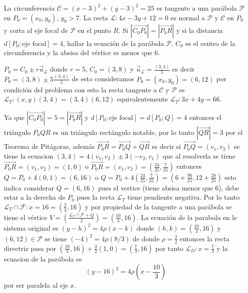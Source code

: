 \documentclass[12pt,]{report}
\theoremstyle{slplain}
\let\BeginKnitrBlock\begin \let\EndKnitrBlock\end
\begin{document}
\BeginKnitrBlock{exercise}
\protect\hypertarget{exr:unnamed-chunk-5}{}{\label{exr:unnamed-chunk-5} }La circunferencia \(\mathcal{C}=(x-3)^2+(y-3)^2=25\) es tangente a una parábola \(\mathcal{P}\) en \(P_0=(x_0,y_0)\), \(y_0>7\). La recta \(\mathcal{L}:4x-3y+12=0\) es normal a \(\mathcal{P}\) y \(\mathcal{C}\) en \(P_0\) y corta al eje focal de \(\mathcal{P}\) en el punto \(R\). Si \(\left|\vec{C_0P_0}\right|=\left|\vec{P_0R}\right|\) y si la distancia \(d[P_0; \text{eje focal}]=4\), hallar la ecuación de la parábola \(\mathcal{P}\). \(C_0\) es el centro de la circunferencia y la absisa del vértice es menor que 6.
\EndKnitrBlock{exercise}

\BeginKnitrBlock{solution}
{}\(P_0=C_0\pm r\vec{u}_{\mathcal{L}}\) donde \(r=5\), \(C_0=(3,8)\) y \(\vec{u}_{\mathcal{L}}=\frac{(3,4)}{5}\) es decir \(P_0=(3,8)\pm 5\frac{(3,4)}{5}\) de esto consideramos \(P_0=(x_0,y_0)=(6,12)\) por condición del problema con esto la recta tangente a \(\mathcal{C}\) y \(\mathcal{P}\) es \(\mathcal{L}_T:(x,y)(3,4)=(3,4)(6,12)\) equivalentemente \(\mathcal{L}_T:3x+4y=66\).

Ya que \(\left|\vec{C_0P_0}\right|=5=\left|\vec{P_0R}\right|\) y \(d[P_0;\text{eje focal}]=d[P_0; Q]=4\) entonces el triángulo \(P_0QR\) es un triángulo rectángulo notable, por lo tanto \(\left|\vec{QR}\right|=3\) por el Teorema de Pitágoras, además \(\vec{P_0R}=\vec{P_0Q}+\vec{QR}\) es decir si \(\vec{P_0Q}=(v_1,v_2)\) se tiene la ecuacion \((3,4)=4(v_1,v_2)\pm 3(-v_2,v_1)\) que al resolverla se tiene \(\vec{P_0R}=(v_1,v_2)=(1,0)\) o \(\vec{P_0R}=(v_1,v_2)=\left(\frac{24}{25},\frac{7}{25}\right)\) entonces \(Q=P_0+4(0,1)=(6,16)\) o \(Q=P_0+4\left(\frac{24}{25},\frac{7}{25}\right)=\left(6+\frac{96}{25},12+\frac{28}{25}\right)\) esto indica considerar \(Q=(6,16)\) pues el vertice (tiene absisa menor que 6), debe estar a la derecha de \(P_0\) pues la recta \(\mathcal{L}_T\) tiene pendiente negativa. Por lo tanto \(\mathcal{L}_T\cap \mathcal{F}:x=16=(\frac{2}{3},16)\) y por propiedad de la tangente a una parábola se tiene el vértice \(V=\left(\frac{\mathcal{L}_T\cap \mathcal{F}+Q}{2}\right)=\left(\frac{10}{3}, 16\right)\). La ecuación de la parabola en le sistema original es \((y-h)^2=4\rho(x-k)\) donde \((h,k)=\left(\frac{10}{3}, 16\right)\) y \((6,12)\in\mathcal{P}\) se tiene \((-4)^2=4\rho(8/3)\) de donde \(\rho=\frac{3}{2}\) entonces la recta directriz pasa por \(\left(\frac{10}{3}, 16\right)+\frac{3}{2}(1,0)=\left(\frac{7}{3}, 16\right)\) por tanto \(\mathcal{L}_D:x=\frac{7}{3}\) y la ecuacion de la parábola es \[(y-16)^2=4\rho\left(x-\frac{10}{3}\right)\] por ser paralela al eje \(x.\)
\EndKnitrBlock{solution}
\end{document}
